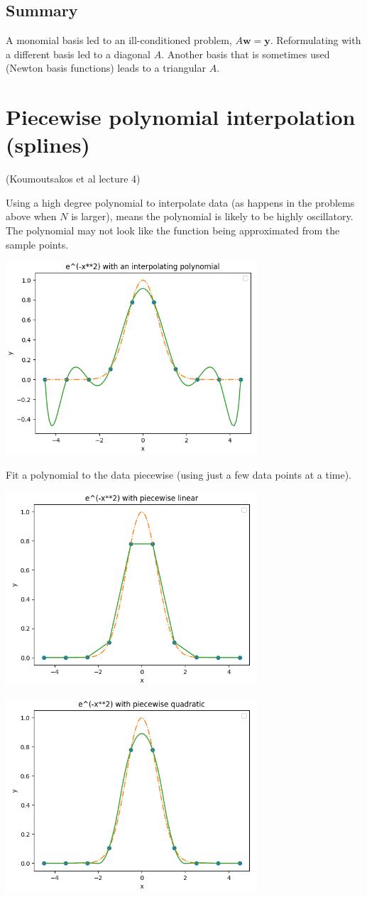 \documentclass[12pt,letterpaper,noanswers]{exam}
\newcommand{\vc}[1]{\boldsymbol{#1}}
\begin{document}
\subsection*{Summary}
A monomial basis led to an ill-conditioned problem, $A\vc{w} = \vc{y}$.  Reformulating with a different basis led to a diagonal $A$.  Another basis that is sometimes used (Newton basis functions) leads to a triangular $A$.

\section*{Piecewise polynomial interpolation (splines)}

(Koumoutsakos et al lecture 4)

Using a high degree polynomial to interpolate data (as happens in the problems above when $N$ is larger), means the polynomial is likely to be highly oscillatory.  The polynomial may not look like the function being approximated from the sample points.

\includegraphics[width=0.7\textwidth]{img/C08gaussinterp.png}

\begin{tcolorbox}
Fit a polynomial to the data piecewise (using just a few data points at a time).
\end{tcolorbox}

\includegraphics[width=0.7\textwidth]{img/C08linearpiece.png}

\includegraphics[width=0.7\textwidth]{img/C08picequad.png}
\end{document}
